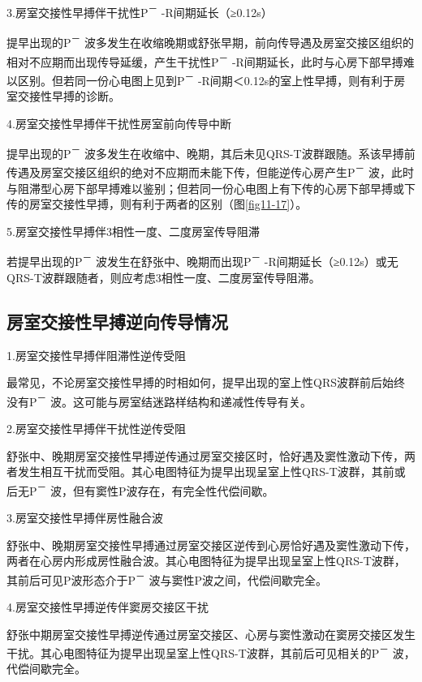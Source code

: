 3.房室交接性早搏伴干扰性P\textsuperscript{－} -R间期延长（≥0.12s）

提早出现的P\textsuperscript{－}
波多发生在收缩晚期或舒张早期，前向传导遇及房室交接区组织的相对不应期而出现传导延缓，产生干扰性P\textsuperscript{－}
-R间期延长，此时与心房下部早搏难以区别。但若同一份心电图上见到P\textsuperscript{－}
-R间期＜0.12s的室上性早搏，则有利于房室交接性早搏的诊断。

4.房室交接性早搏伴干扰性房室前向传导中断

提早出现的P\textsuperscript{－}
波多发生在收缩中、晚期，其后未见QRS-T波群跟随。系该早搏前传遇及房室交接区组织的绝对不应期而未能下传，但能逆传心房产生P\textsuperscript{－}
波，此时与阻滞型心房下部早搏难以鉴别；但若同一份心电图上有下传的心房下部早搏或下传的房室交接性早搏，则有利于两者的区别（图\ref{fig11-17}）。

5.房室交接性早搏伴3相性一度、二度房室传导阻滞

若提早出现的P\textsuperscript{－}
波发生在舒张中、晚期而出现P\textsuperscript{－}
-R间期延长（≥0.12s）或无QRS-T波群跟随者，则应考虑3相性一度、二度房室传导阻滞。

\protect\hypertarget{text00018.htmlux5cux23subid147}{}{}

\subsection{房室交接性早搏逆向传导情况}

1.房室交接性早搏伴阻滞性逆传受阻

最常见，不论房室交接性早搏的时相如何，提早出现的室上性QRS波群前后始终没有P\textsuperscript{－}
波。这可能与房室结迷路样结构和递减性传导有关。

2.房室交接性早搏伴干扰性逆传受阻

舒张中、晚期房室交接性早搏逆传通过房室交接区时，恰好遇及窦性激动下传，两者发生相互干扰而受阻。其心电图特征为提早出现呈室上性QRS-T波群，其前或后无P\textsuperscript{－}
波，但有窦性P波存在，有完全性代偿间歇。

3.房室交接性早搏伴房性融合波

舒张中、晚期房室交接性早搏通过房室交接区逆传到心房恰好遇及窦性激动下传，两者在心房内形成房性融合波。其心电图特征为提早出现呈室上性QRS-T波群，其前后可见P波形态介于P\textsuperscript{－}
波与窦性P波之间，代偿间歇完全。

4.房室交接性早搏逆传伴窦房交接区干扰

舒张中期房室交接性早搏逆传通过房室交接区、心房与窦性激动在窦房交接区发生干扰。其心电图特征为提早出现呈室上性QRS-T波群，其前后可见相关的P\textsuperscript{－}
波，代偿间歇完全。

